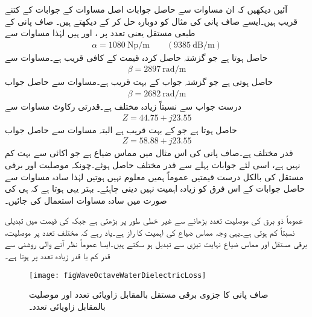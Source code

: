آئیں دیکھیں کہ ان مساوات سے حاصل جوابات اصل مساوات کے جوابات کے کتنے قریب ہیں۔ایسے صاف پانی کی مثال کو دوبارہ حل کر کے دیکھتے ہیں۔ صاف پانی کے طبعی مستقل  یعنی   تعدد پر ،  اور  ہیں لہٰذا  مساوات  سے
\begin{align*}
\alpha =\SI{1080}{\neper \per \meter} \quad \quad (\SI{9385}{\deci\bel\per\meter})
\end{align*}
حاصل ہوتا ہے جو گزشتہ حاصل کردہ قیمت  کے کافی قریب ہے۔مساوات  سے
\begin{align*}
\beta=\SI{2897}{\radian \per \meter}
\end{align*}
حاصل ہوتی ہے جو گزشتہ جواب  کے بہت قریب ہے۔مساوات  سے حاصل جواب
\begin{align*}
\beta=\SI{2682}{\radian \per \meter}
\end{align*}
درست جواب سے نسبتاً زیادہ مختلف ہے۔قدرتی رکاوٹ مساوات  سے
\begin{align*}
Z=44.75+j 23.55
\end{align*}
حاصل ہوتا ہے جو  کے بہت قریب ہے البتہ مساوات  سے حاصل جواب
\begin{align*}
Z=58.88+j23.55
\end{align*}
قدر مختلف ہے۔صاف پانی کی اس مثال میں مماس ضیاع  ہے جو اکائی سے بہت کم نہیں ہے، اسی لئے جوابات پہلے سے قدر مختلف حاصل ہوئے۔چونکہ موصلیت اور برقی مستقل کی بالکل درست قیمتیں عموماً ہمیں معلوم نہیں ہوتیں لہٰذا سادہ مساوات سے حاصل جوابات کے اس فرق کو زیادہ اہمیت نہیں دینی چاہئے۔ بہتر یہی ہوتا ہے کہ  ہی کی صورت میں سادہ مساوات استعمال کی جائیں۔

عموماً ذو برق کی موصلیت تعدد بڑھانے  سے غیر خطی طور پر بڑھتی ہے جبکہ  کی قیمت میں تبدیلی نسبتاً  کم ہوتی ہے۔یہی وجہ مماس ضیاع کی اہمیت کا راز ہے۔یاد رہے کہ مختلف تعدد پر موصلیت، برقی مستقل اور مماس ضیاع نہایت تیزی سے تبدیل ہو سکتے ہیں۔ایسا عموماً نظر آنے والی روشنی سے قدر کم یا قدر زیادہ تعدد پر ہوتا ہے۔ 

\begin{figure}
\centering
\texttt{[image: figWaveOctaveWaterDielectricLoss]}
\caption{صاف پانی کا جزوی برقی مستقل بالمقابل زاویائی تعدد اور موصلیت بالمقابل زاویائی تعدد۔}
\label{شکل_موج_صاف_پانی_تعدد_بالمقابل_برقی_مستقل}
\end{figure}

